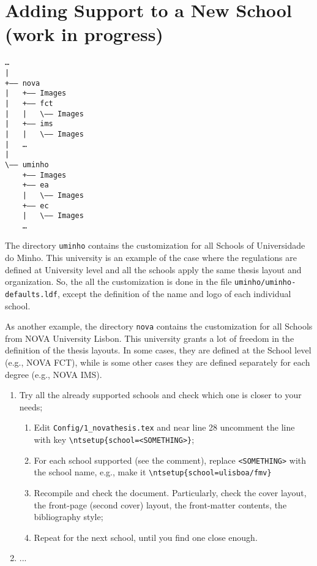 
%

\chapter{Adding Support to a New School (work in progress)}
\label{cha:porting_novathesis}

\begin{verbatim}
…
| 
+—— nova
|   +—— Images
|   +—— fct
|   |   \—— Images
|   +—— ims
|   |   \—— Images
|   …
|   
\—— uminho
    +—— Images
    +—— ea
    |   \—— Images
    +—— ec
    |   \—— Images
    …
\end{verbatim}

The directory \verb!uminho! contains the customization for all Schools of Universidade do Minho.  This university is an example of the case where the regulations are defined at University level and all the schools apply the same thesis layout and organization.  So, the all the customization is done in the file \verb!uminho/uminho-defaults.ldf!, except the definition of the name and logo of each individual school.

As another example, the directory \verb!nova! contains the customization for all Schools from NOVA University Lisbon. This university grants a lot of freedom in the definition of the thesis layouts.  In some cases, they are defined at the School level (e.g., NOVA FCT), while is some other cases they are defined separately for each degree (e.g., NOVA IMS).




\begin{enumerate}
  \item Try all the already supported schools and check which one is closer to your needs;
  \begin{enumerate}
    \item Edit \verb!Config/1_novathesis.tex! and near line 28 uncomment the line with key \verb!\ntsetup{school=<SOMETHING>}!;
    \item For each school supported (see the comment), replace \verb!<SOMETHING>! with the school name, e.g., make it \verb!\ntsetup{school=ulisboa/fmv}!
    \item Recompile and check the document.  Particularly, check the cover layout, the front-page (second cover) layout, the front-matter contents, the bibliography style;
    \item Repeat for the next school, until you find one close enough.
  \end{enumerate}
  \item ...
\end{enumerate}


